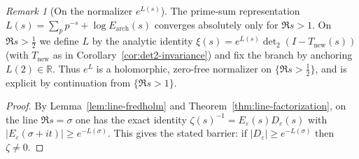 \documentclass[11pt]{article}
\theoremstyle{definition}
\theoremstyle{remark}
\newtheorem{remark}[theorem]{Remark}
\newcommand{\R}{\mathbb{R}}
\begin{document}
\begin{remark}[On the normalizer $e^{L(s)}$]
The prime-sum representation $L(s)=\sum_{p}p^{-s}+\log E_{\mathrm{arch}}(s)$ converges absolutely only for $\Re s>1$. On $\Re s>\tfrac12$ we define $L$ by the analytic identity $\xi(s)=e^{L(s)}\det_2(I-T_{\mathrm{new}}(s))$ (with $T_{\mathrm{new}}$ as in Corollary~\ref{cor:det2-invariance}) and fix the branch by anchoring $L(2)\in\R$. Thus $e^{L}$ is a holomorphic, zero-free normalizer on $\{\Re s>\tfrac12\}$, and is explicit by continuation from $\{\Re s>1\}$.
\end{remark}

\begin{proof}
By Lemma~\ref{lem:line-fredholm} and Theorem~\ref{thm:line-factorization}, on the line $\Re s=\sigma$ one has the exact identity $\zeta(s)^{-1}=E_\varepsilon(s)D_\varepsilon(s)$ with $|E_\varepsilon(\sigma+it)|\ge e^{-L(\sigma)}$. This gives the stated barrier: if $|D_\varepsilon|\ge e^{-L(\sigma)}$ then $\zeta\ne 0$.
\end{proof}
\end{document}
